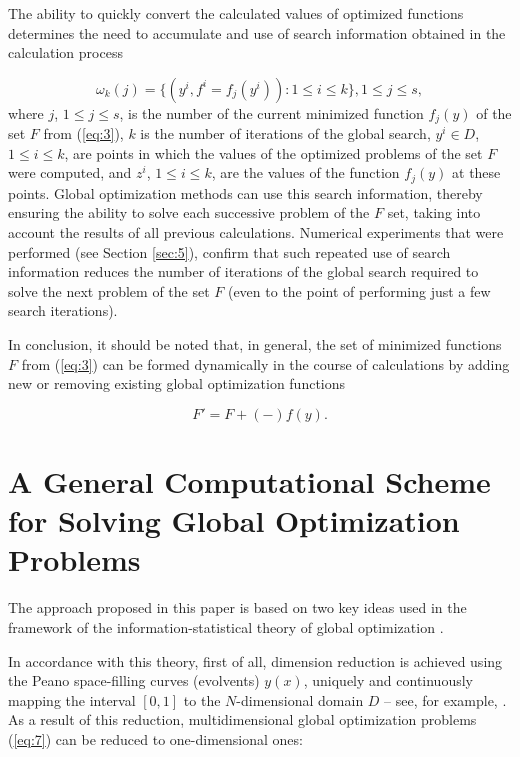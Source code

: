 \documentclass[review]{elsarticle}
\begin{document}
The ability to quickly convert the calculated values of optimized functions determines the need to accumulate and use of search information obtained in the calculation process

\begin{equation}\label{eq:9}
\omega_k (j)=\{(y^i,f^i=f_j(y^i)):1 \leq i \leq k \},1 \leq j \leq s,
\end{equation}
where $j$, $1 \leq j \leq s$, is the number of the current minimized function $f_j(y)$ of the set $F$ from (\ref{eq:3}), $k$ is the number of iterations of the global search, $y^i \in D$, $1 \leq i \leq k$,  are points in which the values of the optimized problems of the set $F$ were computed, and $z^i$, $1 \leq i \leq k$, are the values of the function $f_j(y)$ at these points. Global optimization methods can use this search information, thereby ensuring the ability to solve each successive problem of the $F$ set, taking into account the results of all previous calculations. Numerical experiments that were performed (see Section \ref{sec:5}), confirm that such repeated use of search information reduces the number of iterations of the global search required to solve the next problem of the set $F$ (even to the point of performing just a few search iterations).

In conclusion, it should be noted that, in general, the set of minimized functions $F$ from (\ref{eq:3}) can be formed dynamically in the course of calculations by adding new or removing existing global optimization functions

\begin{equation}\label{eq:10}
F'=F+(-) f(y).
\end{equation}


\section{A General Computational Scheme for Solving Global Optimization Problems}\label{sec:3}

The approach proposed in this paper is based on two key ideas used in the framework of the information-statistical theory of global optimization \cite{c5}.

In accordance with this theory, first of all, dimension reduction is achieved using the Peano space-filling curves (evolvents) $y(x)$, uniquely and continuously mapping the interval $[0,1]$ to the $N$-dimensional domain $D$ -- see, for example, \cite{c5,c21}. As a result of this reduction, multidimensional global optimization problems (\ref{eq:7}) can be reduced to one-dimensional ones: 
\end{document}
